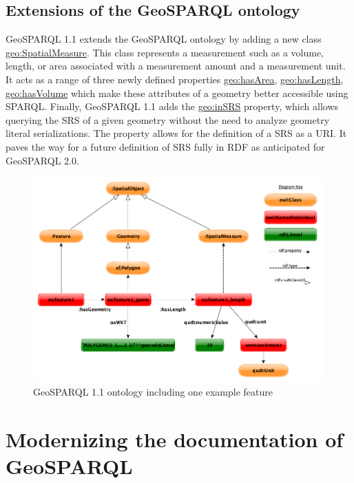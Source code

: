 \documentclass[runningheads]{llncs}
\begin{document}
\subsection{Extensions of the GeoSPARQL ontology}\label{sec:ontologyextensions}
GeoSPARQL 1.1 extends the GeoSPARQL ontology by adding a new class \href{http://www.opengis.net/ont/geosparql#SpatialMeasure}{geo:SpatialMeasure}. 
This class represents a measurement such as a volume, length, or area associated with a measurement amount and a measurement 
unit. It acts as a range of three newly defined properties \href{http://www.opengis.net/ont/geosparql#hasVolume}{geo:hasArea}, 
\href{http://www.opengis.net/ont/geosparql#hasLength}{geo:hasLength}, \href{http://www.opengis.net/ont/geosparql#hasVolume}{geo:hasVolume} 
which make these attributes of a geometry better accessible using SPARQL. Finally, GeoSPARQL 1.1 adds the 
\href{http://www.opengis.net/ont/geosparql#inSRS}{geo:inSRS} property, which allows querying the SRS of a given geometry 
without the need to analyze geometry literal serializations. The property allows for the definition of a SRS as a URI. It 
paves the way for a future definition of SRS fully in RDF as anticipated for GeoSPARQL 2.0.

\begin{figure}[htb]
    \centering
    \includegraphics[width=\linewidth]{images/geold_ontology.png}
    \caption{GeoSPARQL 1.1 ontology including one example feature}
    \label{fig:geosparql11ontology}
\end{figure}


\section{Modernizing the documentation of GeoSPARQL}\label{sec:documentation}
\end{document}
